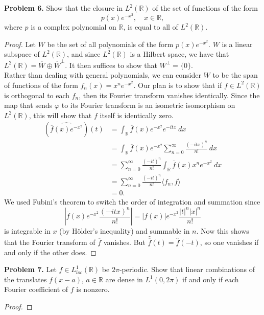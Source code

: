 \documentclass[11pt,letterpaper]{report}
\newcommand{\reals}{\mathbb{R}}
\begin{document}
\noindent\textbf{Problem 6. }
Show that the closure in $L^2(\reals)$ of the set of functions of the form
\[
p(x)e^{-x^2},\quad x\in \reals,
\]
where $p$ is a complex polynomial on $\reals$, is equal to all of $L^2(\reals)$.
\begin{proof}
	Let $W$ be the set of all polynomials of the form $p(x)e^{-x^2}$. $W$ is a linear subspace of $L^2(\reals)$, and since $L^2(\reals)$ is a Hilbert space, we have that $L^2(\reals) = \overline{W}\oplus \overline{W}^\perp$. It then suffices to show that $W^\perp= \{0\}$.\\

	\noindent Rather than dealing with general polynomials, we can consider $W$ to be the span of functions of the form $f_n(x) = x^ne^{-x^2}$. Our plan is to show that if $f\in L^2(\reals)$ is orthogonal to each $f_n$, then its Fourier transform vanishes identically. Since the map that sends $\varphi$ to its Fourier transform is an isometric isomorphism on $L^2(\reals)$, this will show that $f$ itself is identically zero.
	\begin{align*}
		(\widehat{\overline{f}(x)e^{-x^2}})(t)&= \int_\reals \overline{f}(x)e^{-x^2}e^{-itx}\ dx\\
		&= \int_\reals \overline{f}(x)e^{-x^2}\sum_{n=0}^\infty \frac{(-itx)^n}{n!}\ dx\\
		&= \sum_{n=0}^\infty \frac{(-it)^n}{n!}\int_\reals\overline{f}(x)x^ne^{-x^2}\ dx\\
		&= \sum_{n=0}^\infty \frac{(-it)^n}{n!}\langle f_n, f\rangle\\
		&= 0.
	\end{align*}
	We used Fubini's theorem to switch the order of integration and summation since
	\[
	\left|\overline{f}(x)e^{-x^2}\frac{(-itx)^n}{n!}\right| = |f(x)|e^{-x^2}\frac{|t|^n|x|^n}{n!}
	\]
	is integrable in $x$ (by H\"older's inequality) and summable in $n$. Now this shows that the Fourier transform of $\overline{f}$ vanishes. But $\widehat{\overline{f}}(t) = \widehat{f}(-t)$, so one vanishes if and only if the other does. 
\end{proof}

\noindent\textbf{Problem 7. }
Let $f\in L^1_{loc}(\reals)$ be $2\pi$-periodic. Show that linear combinations of the translates $f(x-a)$, $a\in \reals$ are dense in $L^1(0, 2\pi)$ if and only if each Fourier coefficient of $f$ is nonzero.
\begin{proof}
	
\end{proof}
\end{document}
